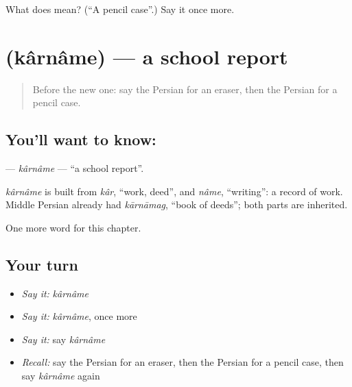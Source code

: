 \begin{tcolorbox}[breakable,colback=teal!4,colframe=teal!35!black,title={Before you move on}]
What does  mean? (\textquotedblleft{}A pencil case\textquotedblright{}.) Say it once more.
\end{tcolorbox}
\section[\texorpdfstring{\fa{کارنامه} (kârnâme)}{کارنامه (kârnâme)}]{ (kârnâme) — a school report}

\label{lesson:FA-C178-karname}



\begin{quote}
Before the new one: say the Persian for an eraser, then the Persian for a pencil case.
\end{quote}

\subsection*{You'll want to know: }
\textbf{} — \emph{kârnâme} — \textquotedblleft{}a school report\textquotedblright{}.

\begin{cousinweb}
\emph{kârnâme} is built from \emph{kâr}, \textquotedblleft{}work, deed\textquotedblright{}, and \emph{nâme}, \textquotedblleft{}writing\textquotedblright{}: a record of work. Middle Persian already had \emph{kārnāmag}, \textquotedblleft{}book of deeds\textquotedblright{}; both parts are inherited.
\end{cousinweb}

\begin{grammarlens}[title={What you've built}]
One more word for this chapter.
\end{grammarlens}

\subsection*{Your turn}
\begin{itemize}
\raggedright
  \item \emph{Say it:} \emph{kârnâme}
  \item \emph{Say it:} \emph{kârnâme}, once more
  \item \emph{Say it:} say \emph{kârnâme}
  \item \emph{Recall:} say the Persian for an eraser, then the Persian for a pencil case, then say \emph{kârnâme} again
\end{itemize}

